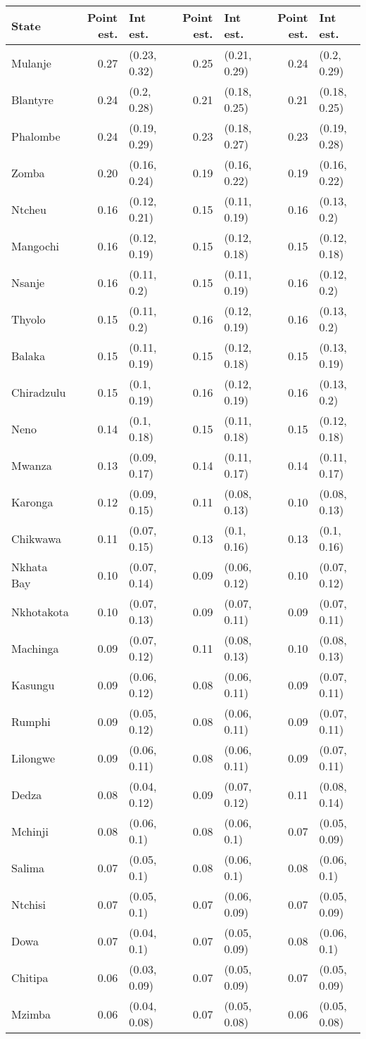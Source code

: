
\begin{tabular}{lrlrlrl}
\toprule
State & Point est. & Int est. & Point est. & Int est. & Point est. & Int est.\\
\midrule
Mulanje & 0.27 & (0.23, 0.32) & 0.25 & (0.21, 0.29) & 0.24 & (0.2, 0.29)\\
Blantyre & 0.24 & (0.2, 0.28) & 0.21 & (0.18, 0.25) & 0.21 & (0.18, 0.25)\\
Phalombe & 0.24 & (0.19, 0.29) & 0.23 & (0.18, 0.27) & 0.23 & (0.19, 0.28)\\
Zomba & 0.20 & (0.16, 0.24) & 0.19 & (0.16, 0.22) & 0.19 & (0.16, 0.22)\\
Ntcheu & 0.16 & (0.12, 0.21) & 0.15 & (0.11, 0.19) & 0.16 & (0.13, 0.2)\\
Mangochi & 0.16 & (0.12, 0.19) & 0.15 & (0.12, 0.18) & 0.15 & (0.12, 0.18)\\
Nsanje & 0.16 & (0.11, 0.2) & 0.15 & (0.11, 0.19) & 0.16 & (0.12, 0.2)\\
Thyolo & 0.15 & (0.11, 0.2) & 0.16 & (0.12, 0.19) & 0.16 & (0.13, 0.2)\\
Balaka & 0.15 & (0.11, 0.19) & 0.15 & (0.12, 0.18) & 0.15 & (0.13, 0.19)\\
Chiradzulu & 0.15 & (0.1, 0.19) & 0.16 & (0.12, 0.19) & 0.16 & (0.13, 0.2)\\
Neno & 0.14 & (0.1, 0.18) & 0.15 & (0.11, 0.18) & 0.15 & (0.12, 0.18)\\
Mwanza & 0.13 & (0.09, 0.17) & 0.14 & (0.11, 0.17) & 0.14 & (0.11, 0.17)\\
Karonga & 0.12 & (0.09, 0.15) & 0.11 & (0.08, 0.13) & 0.10 & (0.08, 0.13)\\
Chikwawa & 0.11 & (0.07, 0.15) & 0.13 & (0.1, 0.16) & 0.13 & (0.1, 0.16)\\
Nkhata Bay & 0.10 & (0.07, 0.14) & 0.09 & (0.06, 0.12) & 0.10 & (0.07, 0.12)\\
Nkhotakota & 0.10 & (0.07, 0.13) & 0.09 & (0.07, 0.11) & 0.09 & (0.07, 0.11)\\
Machinga & 0.09 & (0.07, 0.12) & 0.11 & (0.08, 0.13) & 0.10 & (0.08, 0.13)\\
Kasungu & 0.09 & (0.06, 0.12) & 0.08 & (0.06, 0.11) & 0.09 & (0.07, 0.11)\\
Rumphi & 0.09 & (0.05, 0.12) & 0.08 & (0.06, 0.11) & 0.09 & (0.07, 0.11)\\
Lilongwe & 0.09 & (0.06, 0.11) & 0.08 & (0.06, 0.11) & 0.09 & (0.07, 0.11)\\
Dedza & 0.08 & (0.04, 0.12) & 0.09 & (0.07, 0.12) & 0.11 & (0.08, 0.14)\\
Mchinji & 0.08 & (0.06, 0.1) & 0.08 & (0.06, 0.1) & 0.07 & (0.05, 0.09)\\
Salima & 0.07 & (0.05, 0.1) & 0.08 & (0.06, 0.1) & 0.08 & (0.06, 0.1)\\
Ntchisi & 0.07 & (0.05, 0.1) & 0.07 & (0.06, 0.09) & 0.07 & (0.05, 0.09)\\
Dowa & 0.07 & (0.04, 0.1) & 0.07 & (0.05, 0.09) & 0.08 & (0.06, 0.1)\\
Chitipa & 0.06 & (0.03, 0.09) & 0.07 & (0.05, 0.09) & 0.07 & (0.05, 0.09)\\
Mzimba & 0.06 & (0.04, 0.08) & 0.07 & (0.05, 0.08) & 0.06 & (0.05, 0.08)\\
\bottomrule
\end{tabular}
